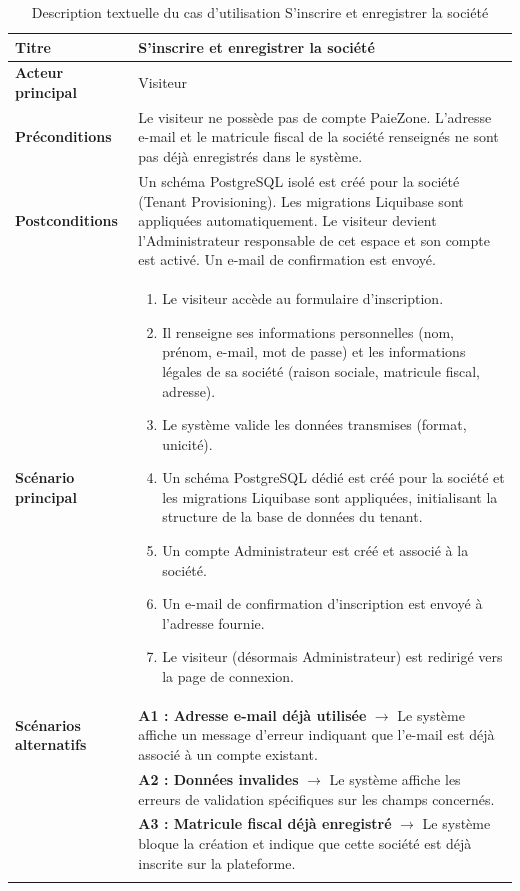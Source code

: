 \begin{xltabular}{\textwidth}{|l|X|}
    \textbf{Titre} & S'inscrire et enregistrer la société \\ \hline
    \textbf{Acteur principal} & Visiteur \\ \hline
    \textbf{Préconditions} & Le visiteur ne possède pas de compte PaieZone. 
    L'adresse e-mail et le matricule fiscal de la société renseignés ne sont 
    pas déjà enregistrés dans le système. \\ \hline
    \textbf{Postconditions} & Un schéma PostgreSQL isolé est créé pour la société 
    (Tenant Provisioning). Les migrations Liquibase sont appliquées automatiquement. 
    Le visiteur devient l'Administrateur responsable de cet espace et son compte 
    est activé. Un e-mail de confirmation est envoyé. \\ \hline
    \textbf{Scénario principal} &
    \begin{enumerate}[nosep, leftmargin=*]
        \item Le visiteur accède au formulaire d'inscription.
        \item Il renseigne ses informations personnelles (nom, prénom, e-mail, 
              mot de passe) et les informations légales de sa société 
              (raison sociale, matricule fiscal, adresse).
        \item Le système valide les données transmises (format, unicité).
        \item Un schéma PostgreSQL dédié est créé pour la société et les migrations 
              Liquibase sont appliquées, initialisant la structure de la base de 
              données du tenant.
        \item Un compte Administrateur est créé et associé à la société.
        \item Un e-mail de confirmation d'inscription est envoyé à l'adresse fournie.
        \item Le visiteur (désormais Administrateur) est redirigé vers la page 
              de connexion.
    \end{enumerate} \\ \hline
    \textbf{Scénarios alternatifs}
    & \textbf{A1 : Adresse e-mail déjà utilisée} $\rightarrow$ Le système affiche 
      un message d'erreur indiquant que l'e-mail est déjà associé à un compte 
      existant. \\ 
    & \textbf{A2 : Données invalides} $\rightarrow$ Le système affiche les erreurs 
      de validation spécifiques sur les champs concernés. \\ 
    & \textbf{A3 : Matricule fiscal déjà enregistré} $\rightarrow$ Le système 
      bloque la création et indique que cette société est déjà inscrite sur 
      la plateforme. 
      \\ \hline
    \caption{Description textuelle du cas d'utilisation S'inscrire et enregistrer la société}
    \label{tab:uc_inscription}
\end{xltabular}

